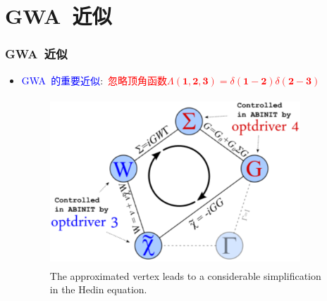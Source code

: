 \documentclass[cjk,slidestop,compress,mathserif,blue]{beamer}
\begin{document}
\section{\rm{GWA~}近似}
\frame
{
	\frametitle{\textrm{GWA~}近似}
	\begin{itemize}
		\item \textcolor{blue}{\textrm{GWA~}的重要近似}:~\textcolor{red}{忽略顶角函数$\Lambda(\mathbf{1},\mathbf{2},\mathbf{3})=\delta(\mathbf{1}-\mathbf{2})\delta(\mathbf{2}-\mathbf{3})$}
\begin{figure}[h!]
\centering
\vspace*{-0.2in}
\includegraphics[height=2.5in,width=3.7in,viewport=0 0 950 660,clip]{Figures/GWA_Hedin_eq.png}
\caption{\small \textrm{The approximated vertex leads to a considerable simplification in the Hedin equation.}}%
\label{GWA_Hedin_eq}
\end{figure} 
	\end{itemize}
}
\end{document}
